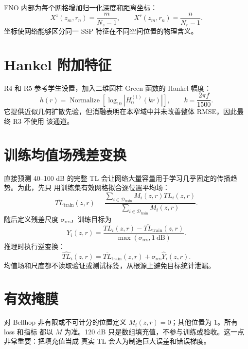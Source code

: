 \documentclass[UTF8,12pt,openany]{ctexrep}
\begin{document}
FNO 内部为每个网格增加归一化深度和距离坐标：
\begin{equation}
  X^z(z_m,r_n)=\frac{m}{N_z-1},\qquad
  X^r(z_m,r_n)=\frac{n}{N_r-1}.
\end{equation}
坐标使网络能够区分同一 SSP 特征在不同空间位置的物理含义。

\section{Hankel 附加特征}

R4 和 R5 参考学生设置，加入二维圆柱 Green 函数的 Hankel 幅度：
\begin{equation}
  h(r)=\operatorname{Normalize}\left[\log_{10}\left|H_0^{(1)}(kr)\right|\right],
  \qquad k=\frac{2\pi f}{1500}.
\end{equation}
它提供近似几何扩散先验，但消融表明在本窄域中并未改善整体 RMSE，因此最终 R3 不使用
该通道。

\section{训练均值场残差变换}

直接预测 40--100 dB 的完整 TL 会让网络大量容量用于学习几乎固定的传播趋势。为此，先只
用训练集有效网格拟合逐位置平均场：
\begin{equation}
  \overline{TL}_{\mathrm{train}}(z,r)=
  \frac{\sum_{i\in\mathcal{D}_{\mathrm{train}}}M_i(z,r)TL_i(z,r)}
  {\sum_{i\in\mathcal{D}_{\mathrm{train}}}M_i(z,r)}.
\end{equation}
随后定义残差尺度 $\sigma_{\mathrm{res}}$，训练目标为
\begin{equation}
  Y_i(z,r)=\frac{TL_i(z,r)-\overline{TL}_{\mathrm{train}}(z,r)}
  {\max(\sigma_{\mathrm{res}},1\ \mathrm{dB})}.
\end{equation}
推理时执行逆变换：
\begin{equation}
  \widehat{TL}_i(z,r)=\overline{TL}_{\mathrm{train}}(z,r)
  +\sigma_{\mathrm{res}}\widehat{Y}_i(z,r).
\end{equation}
均值场和尺度都不读取验证或测试标签，从根源上避免目标统计泄漏。

\section{有效掩膜}

对 Bellhop 非有限或不可计分的位置定义 $M_i(z,r)=0$；其他位置为 1。所有 loss 和指标
都以 $M$ 为准。120 dB 只是数组填充值，不参与训练或验收。这一点非常重要：把填充值当成
真实 TL 会人为制造巨大误差和错误梯度。
\end{document}
